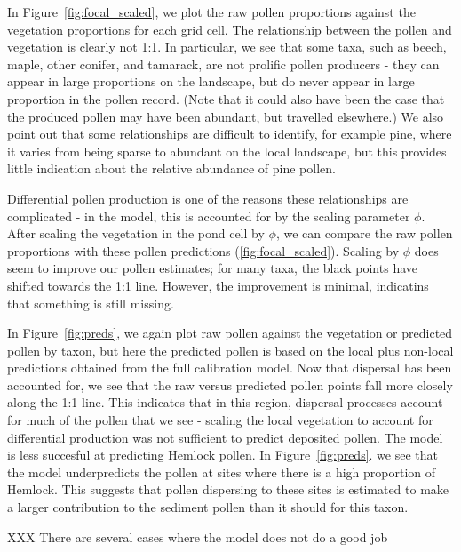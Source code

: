 \documentclass[12pt]{article}
\begin{document}
In Figure~\ref{fig:focal_scaled}, we plot the raw pollen proportions
against the vegetation proportions for each grid cell. The
relationship between the pollen and vegetation is clearly not 1:1. In
particular, we see that some taxa, such as beech, maple, other
conifer, and tamarack, are not prolific pollen producers - they can
appear in large proportions on the landscape, but do never appear in
large proportion in the pollen record. (Note that it could also have
been the case that the produced pollen may have been abundant, but
travelled elsewhere.) We also point out that some relationships are
difficult to identify, for example pine, where it varies from being
sparse to abundant on the local landscape, but this provides little
indication about the relative abundance of pine pollen.

Differential pollen production is one of the reasons these
relationships are complicated - in the model, this is accounted for by
the scaling parameter $\phi$. After scaling the vegetation in the pond
cell by $\phi$, we can compare the raw pollen proportions with these
pollen predictions (\ref{fig:focal_scaled}). Scaling by $\phi$ does seem to improve our pollen estimates; for many taxa, the black points have shifted towards the 1:1 line. However, the improvement is minimal, indicatins that something is still missing.

In Figure~\ref{fig:preds}, we again plot raw pollen against the
vegetation or predicted pollen by taxon, but here the predicted pollen
is based on the local plus non-local predictions obtained from the
full calibration model. Now that dispersal has been accounted for, we
see that the raw versus predicted pollen points fall more closely
along the 1:1 line. This indicates that in this region, dispersal
processes account for much of the pollen that we see - scaling the
local vegetation to account for differential production was not
sufficient to predict deposited pollen. The model is less succesful at
predicting Hemlock pollen. In Figure~\ref{fig:preds}. we see that the
model underpredicts the pollen at sites where there is a high
proportion of Hemlock. This suggests that pollen dispersing to these
sites is estimated to make a larger contribution to the sediment
pollen than it should for this taxon.

XXX There are several cases where the model does not do a good job   
\end{document}
